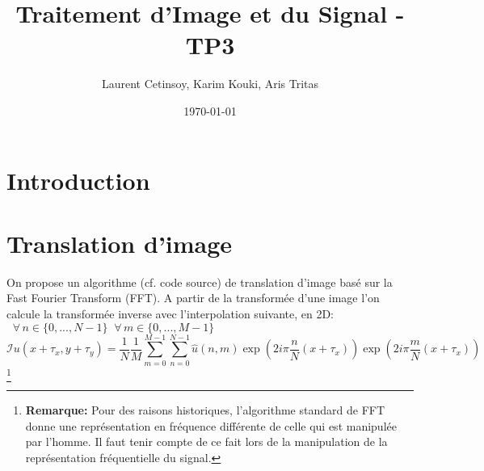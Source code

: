 \documentclass[12pt]{article}
\title{Traitement d'Image et du Signal - TP3}
\author{Laurent Cetinsoy, Karim Kouki, Aris Tritas }
\date{\today}
\begin{document}
\maketitle

\begin{abstract}

\end{abstract}

\section*{Introduction}

\section*{Translation d'image}

On propose un algorithme (cf. code source) de translation d'image basé sur la Fast Fourier Transform (FFT). A partir de la transformée d'une image l'on calcule la transformée inverse avec l'interpolation suivante, en 2D: $\;\;\forall \, n \in \{0, ... ,N-1\}\; \; \forall \, m \in \{0, ... ,M-1\}$ 
\begin{equation*}
\mathcal{I}u(x + \tau_x, y + \tau_y) = \frac{1}{N} \frac{1}{M} \sum_{m=0}^{M-1} \sum_{n=0}^{N-1} \hat{u}(n, m)\exp(2 i \pi \frac{n}{N}(x + \tau_x)) \exp(2 i \pi \frac{m}{N}(x + \tau_x)) \;\; 
\end{equation*}
\footnote{\textbf{Remarque:} Pour des raisons historiques, l'algorithme standard de FFT donne une représentation en fréquence différente de celle qui est manipulée par l'homme. Il faut tenir compte de ce fait lors de la manipulation de la représentation fréquentielle du signal.}
\end{document}
